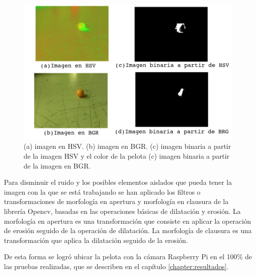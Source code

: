 \begin{figure}[hbtp]
\centering
\includegraphics[scale=0.36]{imagenes/compararHSV_BGR.png}
\caption{(a) imagen en HSV. (b) imagen en BGR. (c) imagen binaria a partir de la imagen HSV y el color de la pelota (c) imagen binaria a partir de la imagen en BGR.}
\label{fig:proces}
\end{figure}

Para disminuir el ruido y los posibles elementos aislados que pueda tener la imagen con la que se está trabajando se han aplicado los filtros o transformaciones de morfología en apertura y morfología en clausura de la librería Opencv, basadas en las operaciones básicas de dilatación y erosión. La morfología en apertura es una transformación que consiste en aplicar la operación de erosión seguido de la operación de dilatación. La morfología de clausura es una transformación que aplica la dilatación seguido de la erosión.

De esta forma se logró ubicar la pelota con la cámara Raspberry Pi en el 100\% de las pruebas realizadas, que se describen en el cap\'itulo \ref{chapter:resultados}.


